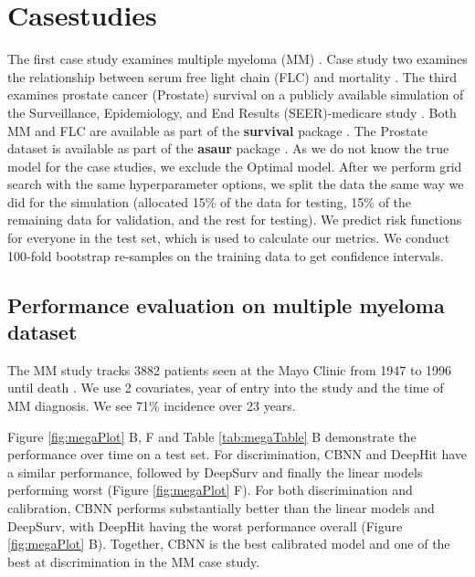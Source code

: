 \documentclass[APA,LATO1COL]{WileyNJD-v2}
\begin{document}
\hypertarget{casestudies}{%
\section{Casestudies}\label{casestudies}}

 The first case study examines multiple myeloma (MM) \citep{myeloma}.
Case study two examines the relationship between serum free light chain (FLC) and mortality \citep{flc}.
The third examines prostate cancer (Prostate) survival on a publicly available simulation of the Surveillance,
Epidemiology, and End Results (SEER)-medicare study \citep{prostate}. Both MM and FLC
are available as part of the \textbf{survival} package \citep{survpkg}. The Prostate dataset is available
as part of the \textbf{asaur} package \citep{asaur}. As we do not know the true model for the case studies,
we exclude the Optimal model. After we perform grid search with the same hyperparameter
options, we split the data the same way we did for the simulation (allocated 15\% of the data for testing,
15\% of the remaining data for validation, and the rest for testing).
We predict risk functions for everyone in the test set, which is used to calculate our metrics. We
conduct 100-fold bootstrap re-samples on the training data to
get confidence intervals.

\hypertarget{pe-multiplemyeloma}{%
\subsection{Performance evaluation on multiple myeloma dataset}\label{pe-multiplemyeloma}}
The MM study tracks 3882 patients seen at the Mayo Clinic from 1947 to 1996 until death \citep{myeloma}.
We use 2 covariates, year of entry into the study and the time of MM diagnosis\citep{myeloma}.
We see 71\% incidence over 23 years\citep{myeloma}.

Figure \ref{fig:megaPlot} B, F and Table \ref{tab:megaTable} B
demonstrate the performance over time on a test set. For discrimination,
CBNN and DeepHit have a similar performance, followed by DeepSurv and finally the linear models performing worst (Figure \ref{fig:megaPlot} F). For
both discrimination and calibration, CBNN performs substantially better than
the linear models and DeepSurv, with DeepHit having the worst performance overall
(Figure \ref{fig:megaPlot} B). Together, CBNN is the best calibrated model and one
of the best at discrimination in the MM case study.

\end{document}
